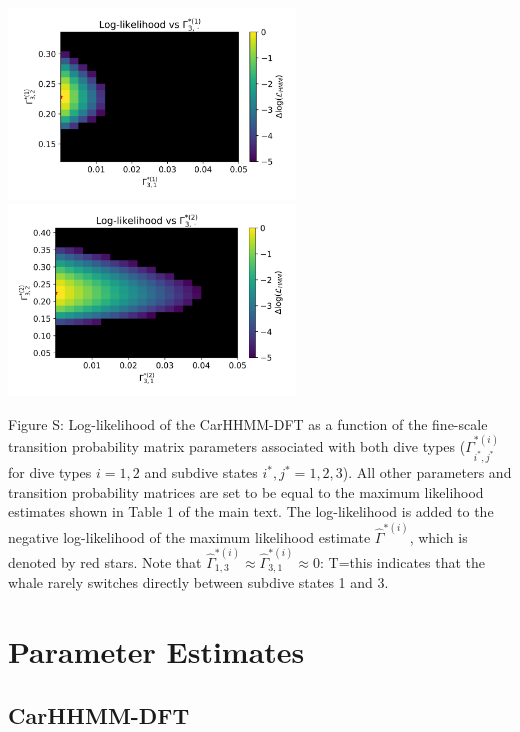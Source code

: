 \documentclass{article}
\begin{document}
\begin{center}
        \includegraphics[width=3in]{../Plots/2019/20190902-182840-CATs_OB_1_0_267_CarHHMM2_fine-gamma-likelihood-0-row_2.png}
        \includegraphics[width=3in]{../Plots/2019/20190902-182840-CATs_OB_1_0_267_CarHHMM2_fine-gamma-likelihood-1-row_2.png}
        \end{center}
        
        \noindent Figure S: Log-likelihood of the CarHHMM-DFT as a function of the fine-scale transition probability matrix parameters associated with both dive types ($\Gamma^{*(i)}_{i^*,j^*}$ for dive types $i = 1,2$ and subdive states $i^*,j^* = 1,2,3$). All other parameters and transition probability matrices are set to be equal to the maximum likelihood estimates shown in Table 1 of the main text. The log-likelihood is added to the negative log-likelihood of the maximum likelihood estimate $\hat \Gamma^{*(i)}$, which is denoted by red stars. Note that $\hat \Gamma^{*(i)}_{1,3} \approx \hat \Gamma^{*(i)}_{3,1} \approx 0$: T=this indicates that the whale rarely switches directly between subdive states 1 and 3.
        \addtocounter{fignum}{1}
        
        \newpage    
    
    \section{Parameter Estimates}

        \subsection{CarHHMM-DFT}
        
\end{document}
